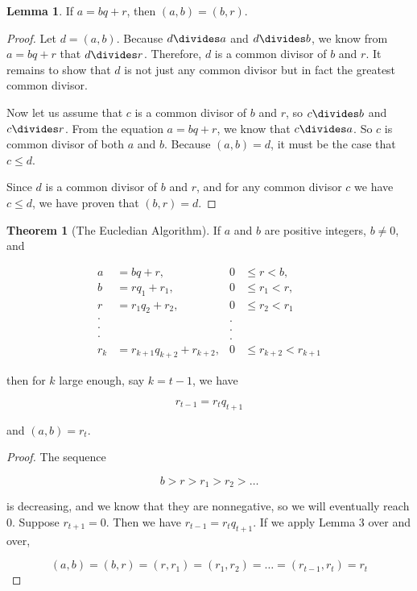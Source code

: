 \documentclass{article}
\theoremstyle{definition} %
\newtheorem{theorem}{Theorem}[section] %
\theoremstyle{definition}
\theoremstyle{definition}
\newtheorem{lemma}{Lemma}[section]
\theoremstyle{definition}
\begin{document}
  \begin{lemma}
    If $a = bq + r$, then $(a, b) = (b, r)$.
  \end{lemma}
  
  \begin{proof}
    Let $d = (a, b)$. Because $d \divides a$ and $d \divides b$, we know from $a = bq + r$ that $d \divides r$.
    Therefore, $d$ is a common divisor of $b$ and $r$. It remains to show that $d$ is not just any common
    divisor but in fact the greatest common divisor.
    
    Now let us assume that $c$ is a common divisor of $b$ and $r$, so $c \divides b$ and $c \divides r$.
    From the equation $a = bq + r$, we know that $c \divides a$. So $c$ is common divisor of both
    $a$ and $b$. Because $(a, b) = d$, it must be the case that $c \leq d$.
    
    Since $d$ is a common divisor of $b$ and $r$, and for any common divisor $c$ we have $c \leq d$,
    we have proven that $(b, r) = d$.
  \end{proof}
  
  \begin{theorem}[The Eucledian Algorithm]
    If $a$ and $b$ are positive integers, $b \ne 0$, and
    
    \begin{align*}
      a &= bq + r,         &0 &\leq r < b, \\
      b &= rq_1 + r_1, &0 &\leq r_1 < r, \\
      r &= r_1q_2 + r_2, &0 &\leq r_2 < r_1 \\
      \cdot & &. \\
      \cdot & &. \\
      \cdot & &. \\
      r_k &= r_{k+1}q_{k+2} + r_{k+2}, &0 &\leq r_{k+2} < r_{k+1}
    \end{align*}
    
    then for $k$ large enough, say $k = t - 1$, we have
    
    \begin{equation*}
      r_{t - 1} = r_tq_{t+1}
    \end{equation*}
    
    and $(a, b) = r_t$.
  \end{theorem}
  
  \begin{proof}
    The sequence
    
    \begin{equation*}
      b > r > r_1 > r_2 > \dots
    \end{equation*}
    
    is decreasing, and we know that they are nonnegative, so we will eventually reach 0. Suppose $r_{t+1} = 0$.
    Then we have $r_{t - 1} = r_tq_{t+1}$. If we apply Lemma 3 over and over,
    
    \begin{equation*}
      (a, b) = (b, r) = (r, r_1) = (r_1, r_2) = \dots = (r_{t-1}, r_t) = r_t
    \end{equation*}
  \end{proof}
  
\end{document}
